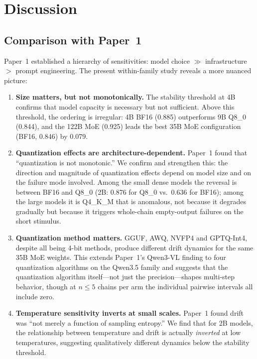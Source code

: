 \documentclass[11pt]{article}
\begin{document}
\section{Discussion}
\label{sec:discussion}

\subsection{Comparison with Paper~1}

Paper~1 established a hierarchy of sensitivities: model choice $\gg$
infrastructure $>$ prompt engineering. The present within-family study
reveals a more nuanced picture:

\begin{enumerate}[leftmargin=*]
  \item \textbf{Size matters, but not monotonically.} The stability threshold
        at 4B confirms that model capacity is necessary but not sufficient.
        Above this threshold, the ordering is irregular: 4B BF16 (0.885)
        outperforms 9B Q8\_0 (0.844), and the 122B MoE (0.925) leads the
        best 35B MoE configuration (BF16, 0.846) by 0.079.
  \item \textbf{Quantization effects are architecture-dependent.}
        Paper~1 found that ``quantization is not monotonic.'' We confirm and
        strengthen this: the direction and magnitude of quantization effects
        depend on model size and on the failure mode involved. Among the
        small dense models the reversal is between BF16 and Q8\_0
        (2B: 0.876 for Q8\_0 vs.\ 0.636 for BF16); among the large models
        it is Q4\_K\_M that is anomalous, not because it degrades
        gradually but because it triggers whole-chain empty-output
        failures on the short stimulus.
  \item \textbf{Quantization method matters.} GGUF, AWQ, NVFP4 and
        GPTQ-Int4, despite all being 4-bit methods, produce different drift
        dynamics for the same 35B MoE weights. This extends Paper~1's
        Qwen3-VL finding to four quantization algorithms on the Qwen3.5
        family and suggests that the quantization algorithm itself---not
        just the precision---shapes multi-step behavior, though at
        $n\leq5$ chains per arm the individual pairwise intervals all
        include zero.
  \item \textbf{Temperature sensitivity inverts at small scales.} Paper~1
        found drift was ``not merely a function of sampling entropy.'' We
        find that for 2B models, the relationship between temperature and
        drift is actually \emph{inverted} at low temperatures, suggesting
        qualitatively different dynamics below the stability threshold.
\end{enumerate}
\end{document}
